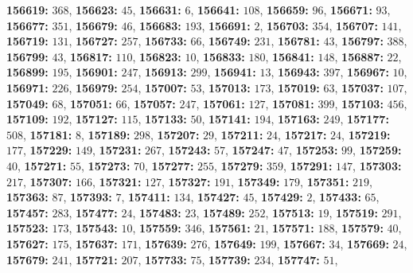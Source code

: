 \textsf{\bfseries 156619:} $368$, \textsf{\bfseries 156623:} $45$, \textsf{\bfseries 156631:} $6$, \textsf{\bfseries 156641:} $108$, \textsf{\bfseries 156659:} $96$, \textsf{\bfseries 156671:} $93$, \textsf{\bfseries 156677:} $351$, \textsf{\bfseries 156679:} $46$, \textsf{\bfseries 156683:} $193$, \textsf{\bfseries 156691:} $2$, \textsf{\bfseries 156703:} $354$, \textsf{\bfseries 156707:} $141$, \textsf{\bfseries 156719:} $131$, \textsf{\bfseries 156727:} $257$, \textsf{\bfseries 156733:} $66$, \textsf{\bfseries 156749:} $231$, \textsf{\bfseries 156781:} $43$, \textsf{\bfseries 156797:} $388$, \textsf{\bfseries 156799:} $43$, \textsf{\bfseries 156817:} $110$, \textsf{\bfseries 156823:} $10$, \textsf{\bfseries 156833:} $180$, \textsf{\bfseries 156841:} $148$, \textsf{\bfseries 156887:} $22$, \textsf{\bfseries 156899:} $195$, \textsf{\bfseries 156901:} $247$, \textsf{\bfseries 156913:} $299$, \textsf{\bfseries 156941:} $13$, \textsf{\bfseries 156943:} $397$, \textsf{\bfseries 156967:} $10$, \textsf{\bfseries 156971:} $226$, \textsf{\bfseries 156979:} $254$, \textsf{\bfseries 157007:} $53$, \textsf{\bfseries 157013:} $173$, \textsf{\bfseries 157019:} $63$, \textsf{\bfseries 157037:} $107$, \textsf{\bfseries 157049:} $68$, \textsf{\bfseries 157051:} $66$, \textsf{\bfseries 157057:} $247$, \textsf{\bfseries 157061:} $127$, \textsf{\bfseries 157081:} $399$, \textsf{\bfseries 157103:} $456$, \textsf{\bfseries 157109:} $192$, \textsf{\bfseries 157127:} $115$, \textsf{\bfseries 157133:} $50$, \textsf{\bfseries 157141:} $194$, \textsf{\bfseries 157163:} $249$, \textsf{\bfseries 157177:} $508$, \textsf{\bfseries 157181:} $8$, \textsf{\bfseries 157189:} $298$, \textsf{\bfseries 157207:} $29$, \textsf{\bfseries 157211:} $24$, \textsf{\bfseries 157217:} $24$, \textsf{\bfseries 157219:} $177$, \textsf{\bfseries 157229:} $149$, \textsf{\bfseries 157231:} $267$, \textsf{\bfseries 157243:} $57$, \textsf{\bfseries 157247:} $47$, \textsf{\bfseries 157253:} $99$, \textsf{\bfseries 157259:} $40$, \textsf{\bfseries 157271:} $55$, \textsf{\bfseries 157273:} $70$, \textsf{\bfseries 157277:} $255$, \textsf{\bfseries 157279:} $359$, \textsf{\bfseries 157291:} $147$, \textsf{\bfseries 157303:} $217$, \textsf{\bfseries 157307:} $166$, \textsf{\bfseries 157321:} $127$, \textsf{\bfseries 157327:} $191$, \textsf{\bfseries 157349:} $179$, \textsf{\bfseries 157351:} $219$, \textsf{\bfseries 157363:} $87$, \textsf{\bfseries 157393:} $7$, \textsf{\bfseries 157411:} $134$, \textsf{\bfseries 157427:} $45$, \textsf{\bfseries 157429:} $2$, \textsf{\bfseries 157433:} $65$, \textsf{\bfseries 157457:} $283$, \textsf{\bfseries 157477:} $24$, \textsf{\bfseries 157483:} $23$, \textsf{\bfseries 157489:} $252$, \textsf{\bfseries 157513:} $19$, \textsf{\bfseries 157519:} $291$, \textsf{\bfseries 157523:} $173$, \textsf{\bfseries 157543:} $10$, \textsf{\bfseries 157559:} $346$, \textsf{\bfseries 157561:} $21$, \textsf{\bfseries 157571:} $188$, \textsf{\bfseries 157579:} $40$, \textsf{\bfseries 157627:} $175$, \textsf{\bfseries 157637:} $171$, \textsf{\bfseries 157639:} $276$, \textsf{\bfseries 157649:} $199$, \textsf{\bfseries 157667:} $34$, \textsf{\bfseries 157669:} $24$, \textsf{\bfseries 157679:} $241$, \textsf{\bfseries 157721:} $207$, \textsf{\bfseries 157733:} $75$, \textsf{\bfseries 157739:} $234$, \textsf{\bfseries 157747:} $51$, 
